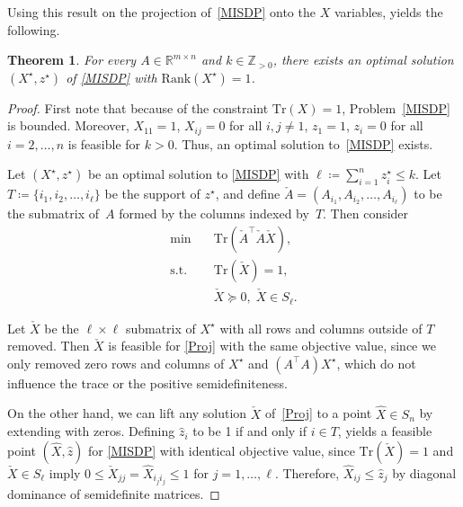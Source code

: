 \documentclass[journal]{IEEEtran}
\newtheorem{theorem}{Theorem}
\newcommand{\define}{\coloneqq}
\newcommand{\T}{^{\top}}
\newcommand{\Tr}{\text{Tr}}
\newcommand{\Rk}{\text{Rank}}
\newcommand{\R}{\mathds{R}}
\newcommand{\Z}{\mathds{Z}}
\begin{document}
Using this result on the projection of~\eqref{MISDP} onto the $X$ variables, yields the following.

\begin{theorem}\label{Rk1thm}
  For every $A \in \R^{m \times n}$ and $k \in \Z_{>0}$, there exists an optimal solution $(X^\star, z^\star)$ of \eqref{MISDP} with $\Rk(X^\star) = 1$. 
\end{theorem}

\begin{proof}
  First note that because of the constraint $\Tr(X) = 1$,
  Problem~\eqref{MISDP} is bounded. Moreover, $X_{11} = 1$, $X_{ij} = 0$
  for all $i,j \neq 1$, $z_1 = 1$, $z_i = 0$ for all $i = 2, \dots, n$ is
  feasible for $k > 0$. Thus, an optimal solution to~\eqref{MISDP} exists.

  Let $(X^\star, z^\star)$ be an optimal solution to \eqref{MISDP} with
  $\ell \define \sum_{i=1}^n z^\star_i \leq k$. Let $T \define \{i_1, i_2,
  \dots, i_\ell\}$ be the support of $z^\star$, and define $\check{A} =
  (A_{i_1}, A_{i_2}, \dots, A_{i_\ell})$ to be the submatrix of~$A$ formed by
  the columns indexed by~$T$. Then consider
  \begin{equation}\label{Proj}
   \begin{aligned}
    \min \quad & \Tr(\check{A}\T \check{A} \check{X}), \\
    \text{s.t.} \quad & \Tr(\check{X}) = 1, \\
    & \check{X} \succeq 0,\; \check{X} \in S_\ell.
   \end{aligned}
  \end{equation}

  Let $\check{X}$ be the $\ell \times \ell$ submatrix of $X^\star$ with all
  rows and columns outside of $T$ removed. Then $\check{X}$ is feasible for
  \eqref{Proj} with the same objective value, since we only removed zero
  rows and columns of $X^\star$ and $(A\T A) X^\star$, which do not
  influence the trace or the positive semidefiniteness.

  On the other hand, we can lift any solution $\check{X}$ of~\eqref{Proj}
  to a point $\hat{X} \in S_n$ by extending with zeros. Defining
  $\hat{z}_i$ to be 1 if and only if $i \in T$, yields a feasible point
  $(\hat{X}, \hat{z})$ for \eqref{MISDP} with identical objective value,
  since $\Tr(\check{X}) = 1$ and $\check{X} \in S_\ell$ imply $0 \leq
  \check{X}_{jj} = \hat{X}_{i_j i_j} \leq 1$ for $j = 1, \dots,
  \ell$. Therefore, $\hat{X}_{ij} \leq \hat{z}_j$ by diagonal dominance of
  semidefinite matrices.


\end{proof}
\end{document}
